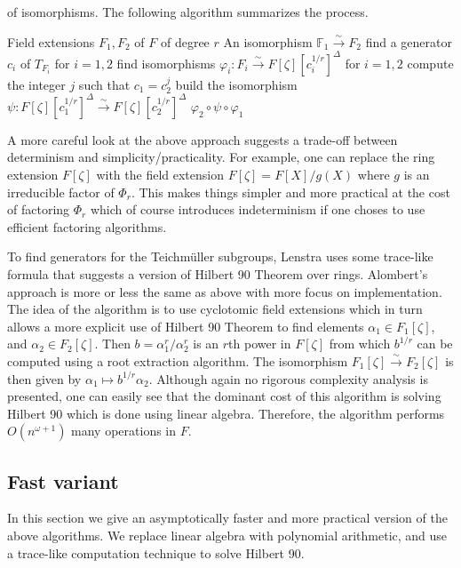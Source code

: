 \documentclass[12pt]{article}
\theoremstyle{plain}
\theoremstyle{definition}
\def\F{\ensuremath{\mathbb{F}}}
\newcounter{algorithm}
\begin{document}
of isomorphisms. The following algorithm summarizes the process.
\begin{algorithm}[Lesntra]
	\begin{algorithmic}[1]
		\REQUIRE Field extensions $F_1, F_2$ of $F$ of degree $r$
		\ENSURE An isomorphism $\F_1 \xrightarrow{\sim} F_2$
		\STATE find a generator $c_i$ of $T_{F_i}$ for $i = 1, 2$
		\STATE find isomorphisms $\varphi_i: F_i \xrightarrow{\sim} F[\zeta][c_i^{1/r}]^\Delta$ for 
		$i = 1, 2$
		\STATE compute the integer $j$ such that $c_1 = c_2^j$
		\STATE build the isomorphism $\psi: F[\zeta][c_1^{1/r}]^\Delta \xrightarrow{\sim} 
		F[\zeta][c_2^{1/r}]^\Delta$
		\RETURN $\varphi_2 \circ \psi \circ \varphi_1$
	\end{algorithmic}
\end{algorithm}
A more careful look at the above approach suggests a trade-off between determinism and 
simplicity/practicality. For example, one can replace the ring extension $F[\zeta]$ with the field 
extension $F[\zeta] = F[X] / g(X)$ where $g$ is an irreducible factor of $\Phi_r$. This makes 
things simpler and more practical at the cost of factoring $\Phi_r$ which of course introduces 
indeterminism if one choses to use efficient factoring algorithms.

To find generators for the Teichm\"{u}ller subgroups, Lenstra uses some trace-like formula that 
suggests a version of Hilbert 90 Theorem over rings. Alombert's approach is more or less the same 
as above with more focus on implementation. The idea of the algorithm is to use cyclotomic field 
extensions which in turn allows a more explicit use of Hilbert 90 Theorem to find elements 
$\alpha_1 \in F_1[\zeta]$, and $\alpha_2 \in F_2[\zeta]$. Then $b = \alpha_1^r / \alpha_2^r$ is an 
$r$th power in $F[\zeta]$ from which $b^{1/r}$ can be computed using a root extraction algorithm. 
The isomorphism $F_1[\zeta] \xrightarrow{\sim} F_2[\zeta]$ is then given by $\alpha_1 \mapsto 
b^{1/r}\alpha_2$. Although again no rigorous complexity analysis is presented, one can easily see 
that the dominant cost of this algorithm is solving Hilbert 90 which is done using linear algebra. 
Therefore, the algorithm performs $O(n^{\omega + 1})$ many operations in $F$.


\subsection{Fast variant}
In this section we give an asymptotically faster and more practical version of the above 
algorithms. We replace linear algebra with polynomial arithmetic, and use a trace-like computation 
technique to solve Hilbert 90. 
\end{document}
